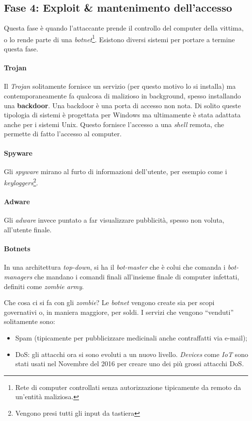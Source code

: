 \subsection{Fase 4: Exploit \& mantenimento dell'accesso}

Questa fase è quando l'attaccante prende il controllo del computer della 
vittima, o lo rende parte di una \textit{botnet}\footnote{Rete di computer 
controllati senza autorizzazione tipicamente da remoto da un'entità maliziosa.}. 
Esistono diversi sistemi per portare a termine questa fase.

\paragraph*{Trojan} Il \textit{Trojan} solitamente fornisce un servizio (per 
questo motivo lo si installa) ma contemporaneamente fa qualcosa di malizioso in 
background, spesso installando una \textbf{backdoor}.
Una backdoor è una porta di accesso non nota. Di solito queste tipologia di 
sistemi è progettata per Windows ma ultimamente è stata adattata anche per i 
sistemi Unix. Questo fornisce l'accesso a una \textit{shell} remota, che 
permette di fatto l'accesso al computer.

\paragraph*{Spyware} Gli \textit{spyware} mirano al furto di informazioni 
dell'utente, per esempio come i \textit{keyloggers}\footnote{Vengono presi tutti 
gli input da tastiera}. 

\paragraph*{Adware} Gli \textit{adware} invece puntato a far visualizzare 
pubblicità, spesso non voluta, all'utente finale.

\paragraph*{Botnets}

In una architettura \textit{top-down}, si ha il \textit{bot-master} che è colui 
che comanda i \textit{bot-managers} che mandano i comandi finali all'insieme 
finale di computer infettati, definiti come \textit{zombie army}.

Che cosa ci si fa con gli \textit{zombie}? Le \textit{botnet} vengono create 
sia per scopi governativi o, in maniera maggiore, per soldi. I servizi che 
vengono ``venduti'' solitamente sono:
\begin{itemize}
\item Spam (tipicamente per pubblicizzare medicinali anche contraffatti via 
e-mail);
\item DoS: gli attacchi ora si sono evoluti a un nuovo livello. \textit{Devices} 
come \textit{IoT} sono stati usati nel Novembre del 2016 per creare uno dei più 
grossi attacchi DoS.
\end{itemize}

